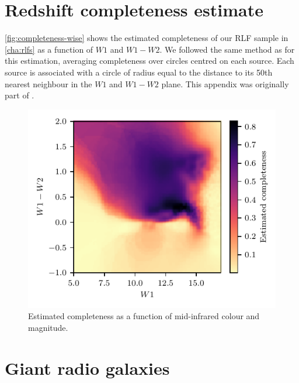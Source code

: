   \section{Redshift completeness estimate}
  \label{sec:rlfs-completeness}

    \autoref{fig:completeness-wise} shows the estimated completeness of our RLF sample in \autoref{cha:rlfs} as a function of $W1$ and $W1-W2$. We followed the same method as \citet{pracy16rlf} for this estimation, averaging completeness over circles centred on each source. Each source is associated with a circle of radius equal to the distance to its 50th nearest neighbour in the $W1$ and $W1-W2$ plane. This appendix was originally part of \citet{alger21rlfs}.

    \begin{figure}
        \centering
        \includegraphics{rlf-images/completeness_wise.pdf}
        \caption{\label{fig:completeness-wise} Estimated completeness as a function of mid-infrared colour and magnitude.}
    \end{figure}

  \section{Giant radio galaxies}
  \label{sec:rlfs-giants}

